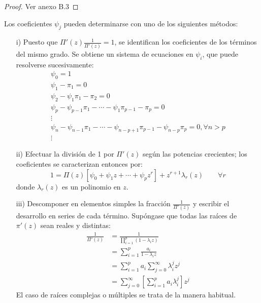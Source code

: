 \begin{proof}
 Ver anexo B.3
\end{proof}

\begin{observacion}
Los coeficientes $\psi_{j} $ pueden determinarse con uno de los siguientes m\'{e}todos: 

\begin{enumerate}
\item[i)] Puesto que $\Pi'(z)\frac 1{\Pi'(z)}=1$, se identifican los coeficientes de los t\'{e}rminos del mismo grado. Se obtiene un sistema de ecuaciones en $\psi_{i} $, que puede resolverse sucesivamente:
\begin{gather*}
 \psi_{0} =1 \\ 
 \psi_{1} -\pi_{1} =0 \\ 
 \psi_{2} -\psi_{1} \pi_{1} -\pi_{2} =0 \\ 
 \psi_{p} -\psi_{p-1} \pi_{1} -\cdots-\psi_{1} \pi_{p-1} -\pi_{p} =0 \\ 
 \vdots \\ 
 \psi_{n} -\psi_{n-1} \pi_{1}-\cdots-\psi_{n-p+1} \pi_{p-1} -\psi_{n-p} \pi_{p} =0, \forall n>p \\ 
 \vdots 
\end{gather*}

\item[ii)] Efectuar la divisi\'{o}n de 1 por $\Pi'(z)$ seg\'{u}n las potencias crecientes; los coeficientes se caracterizan entonces por:
\[
 1=\Pi(z)[\psi_0+\psi_1z+\cdots+ \psi_pz^r]+z^{r+1}\lambda_r(z)\qquad \forall r
\]
donde $\lambda_{r}( z )$ es un polinomio en $z$. 

\item[iii)] Descomponer en elementos simples la fracci\'{o}n $\frac{1}{\Pi'( z )}$ y escribir el desarrollo en series de cada t\'{e}rmino. Sup\'{o}ngase que todas las ra\'{i}ces de $\pi'( z )$ sean reales y distintas:
\begin{align*}
\frac{1}{\Pi'\left( z \right)}
	&=\frac{1}{\prod_{i=1}^{p} ( {1-\lambda_{i} z} )}\\
	&=\sum_{i=1}^p {\frac{a_{i}}{1-\lambda_{i} z}}\\
	&=\sum_{i=1}^p {a_{i} } \sum_{j=0}^\infty {\lambda_{i}^{j} } z^{j}\\
	&=\sum_{j=0}^\infty {\left[ {\sum_{i=1}^p {a_{i} \lambda _{i}^{j} } } \right]} z^{j}
\end{align*}
El caso de ra\'{i}ces complejas o m\'{u}ltiples se trata de la manera habitual.
\end{enumerate}
\end{observacion}



